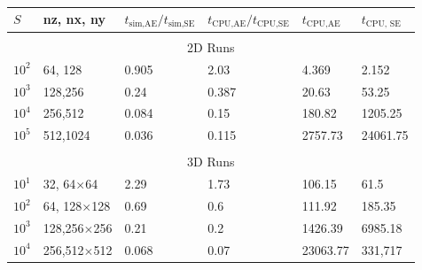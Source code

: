 \documentclass[aps, pre, onecolumn, nofootinbib, notitlepage, groupedaddress, amsfonts, amssymb, amsmath, longbibliography]{revtex4-1}
\begin{document}
\begin{table}
\caption{
}
\label{table:speed}
\begin{center}
\begin{tabularx}{\textwidth}{ X X X X X X}
\hline																	
$S$	&	nz, nx, ny	&	$t_{\text{sim,AE}}/t_{\text{sim,SE}}$	&	
$t_{\text{CPU,AE}}/t_{\text{CPU,SE}}$ & $t_{\text{CPU,AE}}$ & $t_{\text{CPU, SE}}$		\\
\hline \hline \multicolumn{6}{c}{\vspace{-0.2cm}}\\
\multicolumn{6}{c}{\vspace{0.1cm}2D Runs} \\
\hline
$10^2$	&	64,	128	&	0.905   & 2.03  & 4.369 &  2.152    \\
$10^3$	&	128,256	&	0.24    & 0.387 & 20.63 &  53.25    \\
$10^4$	&	256,512	&	0.084   & 0.15  & 180.82&  1205.25  \\
$10^5$	&	512,1024&	0.036   & 0.115 & 2757.73& 24061.75 \\
\hline \hline \multicolumn{6}{c}{\vspace{-0.2cm}}\\
\multicolumn{6}{c}{\vspace{0.1cm}3D Runs} \\
\hline
$10^1$	&	32,	64$\times$64	& 2.29	& 1.73  &   106.15      &   61.5\\
$10^2$	&	64,	128$\times$128	& 0.69	& 0.6   &   111.92      &   185.35\\
$10^3$	&	128,256$\times$256	& 0.21	& 0.2   &   1426.39     &   6985.18\\
$10^4$	&	256,512$\times$512	& 0.068	& 0.07  &   23063.77    &   331,717\\
\hline																	
\end{tabularx}
\end{center}
\end{table}
\end{document}
